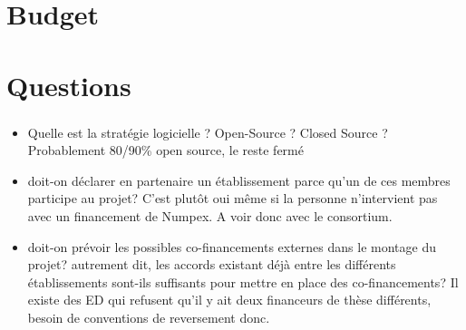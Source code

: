 \section{Budget}

\begin{frame}
  \frametitle{\insertsectionhead}

  

\end{frame}
\section{Questions}

\begin{frame}
  \frametitle{\insertsectionhead}  

  \begin{itemize}
    \item Quelle est la stratégie logicielle ? Open-Source ? Closed Source ? Probablement 80/90\% open source, le reste fermé
    \item doit-on déclarer en partenaire un établissement parce qu'un de ces membres participe au projet? C'est plutôt oui même si la personne n'intervient pas avec un financement de Numpex. A voir donc avec le consortium.
    \item doit-on prévoir les possibles co-financements externes dans le montage du projet? autrement dit, les accords existant déjà entre les différents établissements sont-ils suffisants pour mettre en place des co-financements? Il existe des ED qui refusent qu'il y ait deux financeurs de thèse différents, besoin de conventions de reversement donc.
  \end{itemize}

  

\end{frame}